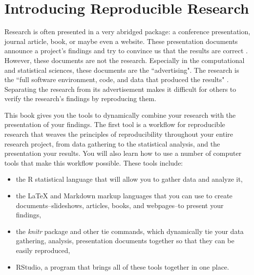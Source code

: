 



\chapter{Introducing Reproducible Research}\label{Intro}

Research is often presented in a very abridged package: a conference presentation, journal article, book, or maybe even a website. These presentation documents announce a project's findings and try to convince us that the results are correct \cite[]{Mesirov2010}. However, these documents are not the research. Especially in the computational and statistical sciences, these documents are the ``advertising". The research is the ``full software environment, code, and data that produced the results" \cite[385]{Buckheit1995,Donoho2010}. Separating the research from its advertisement makes it difficult for others to verify the research's findings by reproducing them. 

This book gives you the tools to dynamically combine your research with the presentation of your findings. The first tool is a workflow for reproducible research that weaves the principles of reproducibility throughout your entire research project, from data gathering to the statistical analysis, and the presentation your results. You will also learn how to use a number of computer tools that make this workflow possible. These tools include:

\begin{itemize}
    \item the R statistical language that will allow you to gather data and analyze it,
    \item the LaTeX and Markdown markup languages that you can use to create documents--slideshows, articles, books, and webpages--to present your findings,
    \item the {\emph{knitr}} package and other tie commands, which dynamically tie your data gathering, analysis, presentation documents together so that they can be easily reproduced,
    \item RStudio, a program that brings all of these tools together in one place.
\end{itemize}


